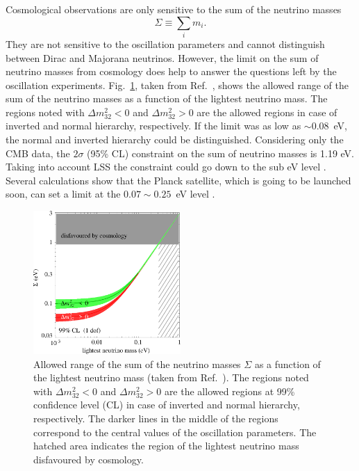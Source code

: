 Cosmological observations are only sensitive to the sum of the
neutrino masses
\begin{equation}
  \label{eq:msum}
  \Sigma \equiv \sum_{i}m_{i}.
\end{equation}
They are not sensitive to the oscillation parameters and cannot
distinguish between Dirac and Majorana neutrinos. However, the limit
on the sum of neutrino masses from cosmology does help to answer the
questions left by the oscillation
experiments. Fig.~\ref{fig:sumVSlightest}, taken from
Ref.~\cite{Str05}, shows the allowed range of the sum of the neutrino
masses as a function of the lightest neutrino mass. The regions noted
with $\Delta m^{2}_{32}<0$ and $\Delta m^{2}_{32}>0$ are the allowed
regions in case of inverted and normal hierarchy, respectively. If the
limit was as low as $\sim 0.08$~eV, the normal and inverted hierarchy
could be distinguished. Considering only the CMB data, the $2\sigma$
(95\% CL) constraint on the sum of neutrino masses is 1.19 eV. Taking
into account LSS the constraint could go down to the sub eV level
\cite{Fog08}. Several calculations show that the Planck satellite,
which is going to be launched soon, can set a limit at the $0.07 \sim
0.25$~eV level \cite{Pla05}.
\begin{figure}[tbhp]
\centering
\includegraphics[width=0.5\textwidth]{sumVSlightest}  
\caption{Allowed range of the sum of the neutrino masses $\Sigma$ as a
function of the lightest neutrino mass (taken from
Ref.~\cite{Str05}). The regions noted with $\Delta m^{2}_{32}<0$ and
$\Delta m^{2}_{32}>0$ are the allowed regions at 99\% confidence level
(CL) in case of inverted and normal hierarchy, respectively. The
darker lines in the middle of the regions correspond to the central
values of the oscillation parameters. The hatched area indicates the
region of the lightest neutrino mass disfavoured by cosmology.}
\label{fig:sumVSlightest}
\end{figure}

